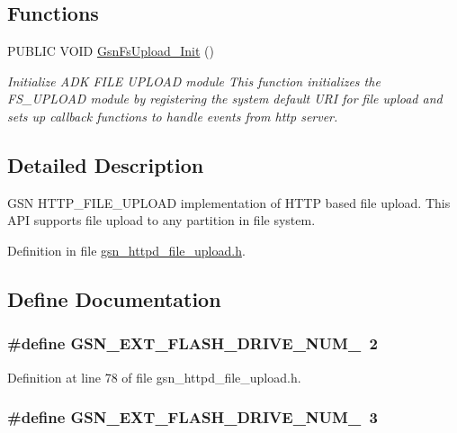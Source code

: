 \subsection*{Functions}
\begin{DoxyCompactItemize}
\item 
PUBLIC VOID \hyperlink{a00667_ga3ab1de7bf3714fa743ccfadc3a00f835}{GsnFsUpload\_\-Init} ()
\begin{DoxyCompactList}\small\item\em Initialize ADK FILE UPLOAD module This function initializes the FS\_\-UPLOAD module by registering the system default URI for file upload and sets up callback functions to handle events from http server. \end{DoxyCompactList}\end{DoxyCompactItemize}


\subsection{Detailed Description}
GSN HTTP\_\-FILE\_\-UPLOAD implementation of HTTP based file upload. This API supports file upload to any partition in file system. 

Definition in file \hyperlink{a00512_source}{gsn\_\-httpd\_\-file\_\-upload.h}.



\subsection{Define Documentation}
\hypertarget{a00512_ab5c1bca572ab41227e20e3e9ce33aaf8}{
\subsubsection[{GSN\_\-EXT\_\-FLASH\_\-DRIVE\_\-NUM\_\-2}]{\setlength{\rightskip}{0pt plus 5cm}\#define GSN\_\-EXT\_\-FLASH\_\-DRIVE\_\-NUM\_~2}}
\label{a00512_ab5c1bca572ab41227e20e3e9ce33aaf8}


Definition at line 78 of file gsn\_\-httpd\_\-file\_\-upload.h.

\hypertarget{a00512_a02c5f458fa66efa8b7d9d6e85a3c4e2e}{
\subsubsection[{GSN\_\-EXT\_\-FLASH\_\-DRIVE\_\-NUM\_\-3}]{\setlength{\rightskip}{0pt plus 5cm}\#define GSN\_\-EXT\_\-FLASH\_\-DRIVE\_\-NUM\_~3}}
\label{a00512_a02c5f458fa66efa8b7d9d6e85a3c4e2e}


